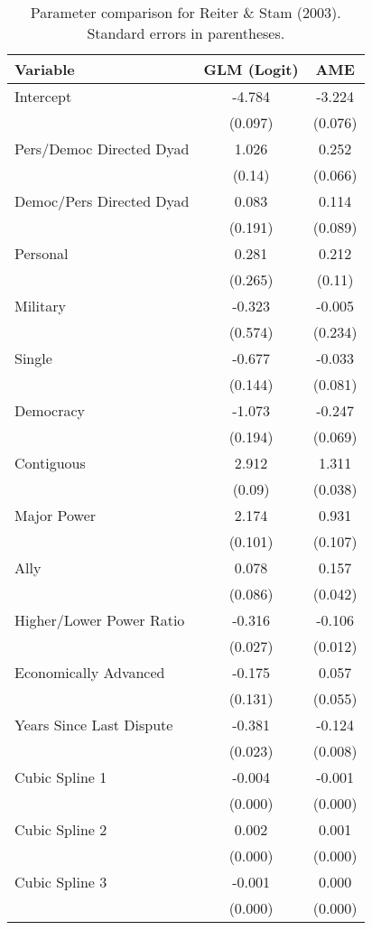 \begin{table}[ht]
\centering
\begingroup\normalsize
\begin{tabular}{lcc}
 Variable & GLM (Logit) & AME \\ 
  \hline
\hline
Intercept & -4.784 & -3.224 \\ 
   & (0.097) & (0.076) \\ 
  Pers/Democ Directed Dyad & 1.026 & 0.252 \\ 
   & (0.14) & (0.066) \\ 
  Democ/Pers Directed Dyad & 0.083 & 0.114 \\ 
   & (0.191) & (0.089) \\ 
  Personal & 0.281 & 0.212 \\ 
   & (0.265) & (0.11) \\ 
  Military & -0.323 & -0.005 \\ 
   & (0.574) & (0.234) \\ 
  Single & -0.677 & -0.033 \\ 
   & (0.144) & (0.081) \\ 
  Democracy & -1.073 & -0.247 \\ 
   & (0.194) & (0.069) \\ 
  Contiguous & 2.912 & 1.311 \\ 
   & (0.09) & (0.038) \\ 
  Major Power & 2.174 & 0.931 \\ 
   & (0.101) & (0.107) \\ 
  Ally & 0.078 & 0.157 \\ 
   & (0.086) & (0.042) \\ 
  Higher/Lower Power Ratio & -0.316 & -0.106 \\ 
   & (0.027) & (0.012) \\ 
  Economically Advanced & -0.175 & 0.057 \\ 
   & (0.131) & (0.055) \\ 
  Years Since Last Dispute & -0.381 & -0.124 \\ 
   & (0.023) & (0.008) \\ 
  Cubic Spline 1 & -0.004 & -0.001 \\ 
   & (0.000) & (0.000) \\ 
  Cubic Spline 2 & 0.002 & 0.001 \\ 
   & (0.000) & (0.000) \\ 
  Cubic Spline 3 & -0.001 & 0.000 \\ 
   & (0.000) & (0.000) \\ 
   \hline
\hline
\end{tabular}
\endgroup
\caption{Parameter comparison for Reiter \& Stam (2003). Standard errors in parentheses.} 
\label{tab:appendix_tableB1_coef}
\end{table}
